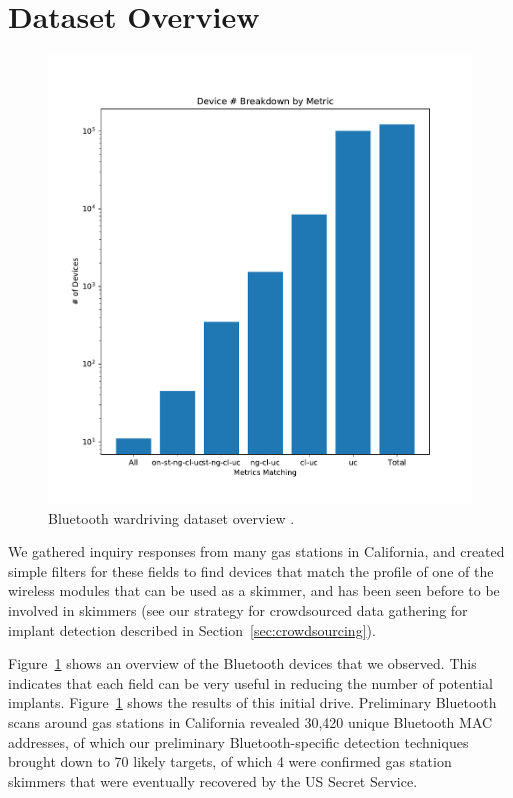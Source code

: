 \section{Dataset Overview}

\begin{figure}
\centering
\includegraphics[width=\linewidth]{fig/dbstats}
\caption{
\label{fig:dbstats}
Bluetooth wardriving dataset overview .
}
\end{figure}

We gathered inquiry responses from many gas stations in California, and created
simple filters for these fields to find devices that match the profile of one
of the wireless modules that can be used as a skimmer, and has been
seen before to be involved in skimmers (see our strategy for crowdsourced data
gathering for implant detection described in Section~\ref{sec:crowdsourcing}). 

Figure~\ref{fig:dbstats} shows an overview of the Bluetooth devices that we
observed.
%
%
This indicates that each field can be very useful in reducing the number of
potential implants. 
%
Figure~\ref{fig:dbstats} shows the results of this initial drive. Preliminary
Bluetooth scans around gas stations in California revealed 30,420 unique
Bluetooth MAC addresses, of which our preliminary Bluetooth-specific detection
techniques brought down to 70 likely targets, of which 4 were confirmed gas
station skimmers that were eventually recovered by the US Secret Service.


